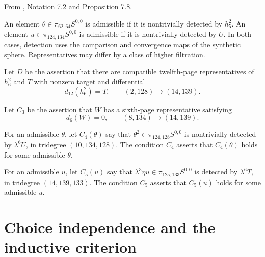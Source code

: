 \begin{definition}
\label{sem:Main:admissible-representatives}
From \cite{LWX126}, Notation 7.2 and Proposition 7.8.\par

An element $\theta\in\pi_{62,64}S^{0,0}$ is admissible if it is nontrivially detected by $h_5^2$. An element $u\in\pi_{124,134}S^{0,0}$ is admissible if it is nontrivially detected by $U$. In both cases, detection uses the comparison and convergence maps of the synthetic sphere. Representatives may differ by a class of higher filtration.

Let $D$ be the assertion that there are compatible twelfth-page representatives of $h_6^2$ and $T$ with nonzero target and differential
\[
 d_{12}(h_6^2)=T,\qquad (2,128)\longrightarrow(14,139).
\]

Let $C_3$ be the assertion that $W$ has a sixth-page representative satisfying
\[
 d_6(W)=0,\qquad (8,134)\longrightarrow(14,139).
\]

For an admissible $\theta$, let $C_4(\theta)$ say that $\theta^2\in\pi_{124,128}S^{0,0}$ is nontrivially detected by $\lambda^6 U$, in tridegree $(10,134,128)$. The condition $C_4$ asserts that $C_4(\theta)$ holds for some admissible $\theta$.

For an admissible $u$, let $C_5(u)$ say that $\lambda^3\eta u\in\pi_{125,133}S^{0,0}$ is detected by $\lambda^6 T$, in tridegree $(14,139,133)$. The condition $C_5$ asserts that $C_5(u)$ holds for some admissible $u$.
\end{definition}

\section{Choice independence and the inductive criterion}

